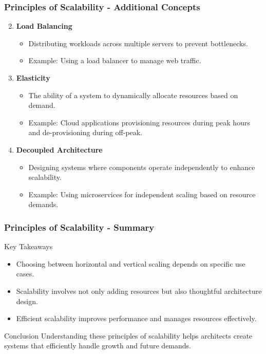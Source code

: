 \documentclass[aspectratio=169]{beamer}
\begin{document}
\begin{frame}[fragile]
    \frametitle{Principles of Scalability - Additional Concepts}
    \begin{enumerate}
        \setcounter{enumi}{1} %
        \item \textbf{Load Balancing}
        \begin{itemize}
            \item Distributing workloads across multiple servers to prevent bottlenecks.
            \item Example: Using a load balancer to manage web traffic.
        \end{itemize}
      
        \item \textbf{Elasticity}
        \begin{itemize}
            \item The ability of a system to dynamically allocate resources based on demand.
            \item Example: Cloud applications provisioning resources during peak hours and de-provisioning during off-peak.
        \end{itemize}

        \item \textbf{Decoupled Architecture}
        \begin{itemize}
            \item Designing systems where components operate independently to enhance scalability.
            \item Example: Using microservices for independent scaling based on resource demands.
        \end{itemize}
    \end{enumerate}
\end{frame}

\begin{frame}[fragile]
    \frametitle{Principles of Scalability - Summary}
    \begin{block}{Key Takeaways}
        \begin{itemize}
            \item Choosing between horizontal and vertical scaling depends on specific use cases.
            \item Scalability involves not only adding resources but also thoughtful architecture design.
            \item Efficient scalability improves performance and manages resources effectively.
        \end{itemize}
    \end{block}

    \begin{block}{Conclusion}
        Understanding these principles of scalability helps architects create systems that efficiently handle growth and future demands.
    \end{block}
\end{frame}
\end{document}
